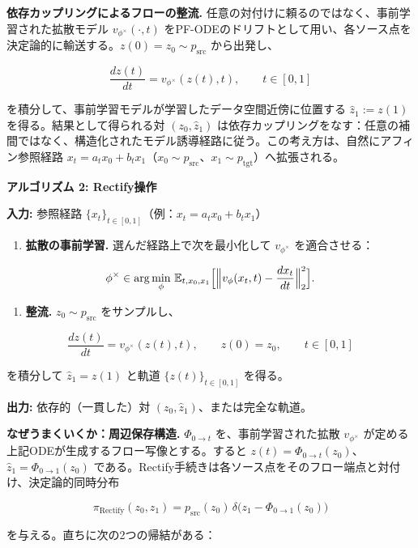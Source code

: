 \textbf{依存カップリングによるフローの整流.} 任意の対付けに頼るのではなく、事前学習された拡散モデル $v_{\phi^\times}(\cdot, t)$ をPF-ODEのドリフトとして用い、各ソース点を決定論的に輸送する。$z(0) = z_0 \sim p_{\mathrm{src}}$ から出発し、

\[
\frac{dz(t)}{dt} = v_{\phi^\times}(z(t), t), \qquad t \in [0, 1]
\]


を積分して、事前学習モデルが学習したデータ空間近傍に位置する $\hat{z}_1 := z(1)$ を得る。結果として得られる対 $(z_0, \hat{z}_1)$ は依存カップリングをなす：任意の補間ではなく、構造化されたモデル誘導経路に従う。この考え方は、自然にアフィン参照経路 $x_t = a_t x_0 + b_t x_1$（$x_0 \sim p_{\mathrm{src}}$、$x_1 \sim p_{\mathrm{tgt}}$）へ拡張される。

\textbf{アルゴリズム 2: Rectify操作}

\textbf{入力:} 参照経路 $\{x_t\}_{t\in[0,1]}$（例：$x_t = a_t x_0 + b_t x_1$）

\begin{enumerate}
\item \textbf{拡散の事前学習.} 選んだ経路上で次を最小化して $v_{\phi^\times}$ を適合させる：
\end{enumerate}

\[
\phi^\times \in \arg\min_\phi\, \mathbb{E}_{t,x_0,x_1}\Bigl[\Bigl\|v_\phi(x_t, t) - \frac{dx_t}{dt}\Bigr\|_2^2\Bigr].
\]


\begin{enumerate}
\item \textbf{整流.} $z_0 \sim p_{\mathrm{src}}$ をサンプルし、
\end{enumerate}

\[
\frac{dz(t)}{dt} = v_{\phi^\times}(z(t), t), \qquad z(0) = z_0, \qquad t \in [0, 1]
\]

を積分して $\hat{z}_1 = z(1)$ と軌道 $\{z(t)\}_{t\in[0,1]}$ を得る。

\textbf{出力:} 依存的（一貫した）対 $(z_0, \hat{z}_1)$、または完全な軌道。

\textbf{なぜうまくいくか：周辺保存構造.} $\Phi_{0\to t}$ を、事前学習された拡散 $v_{\phi^\times}$ が定める上記ODEが生成するフロー写像とする。すると $z(t) = \Phi_{0\to t}(z_0)$、$\hat{z}_1 = \Phi_{0\to 1}(z_0)$ である。Rectify手続きは各ソース点をそのフロー端点と対付け、決定論的同時分布

\[
\pi_{\mathrm{Rectify}}(z_0, z_1) = p_{\mathrm{src}}(z_0)\, \delta\bigl(z_1 - \Phi_{0\to 1}(z_0)\bigr)
\]


を与える。直ちに次の2つの帰結がある：

